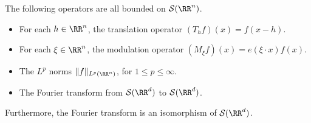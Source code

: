\begin{theorem}
    The following operators are all bounded on $\mathcal{S}(\RR^n)$.
    \begin{itemize}
        \item For each $h \in \RR^n$, the translation operator $(T_h f)(x) = f(x - h)$.

        \item For each $\xi \in \RR^n$, the modulation operator $(M_\xi f)(x) = e(\xi \cdot x) f(x)$.

        \item The $L^p$ norms $\| f \|_{L^p(\RR^n)}$, for $1 \leq p \leq \infty$.

        \item The Fourier transform from $\mathcal{S}(\RR^d)$ to $\mathcal{S}(\RR^d)$.
    \end{itemize}
    Furthermore, the Fourier transform is an isomorphism of $\mathcal{S}(\RR^d)$.
\end{theorem}
